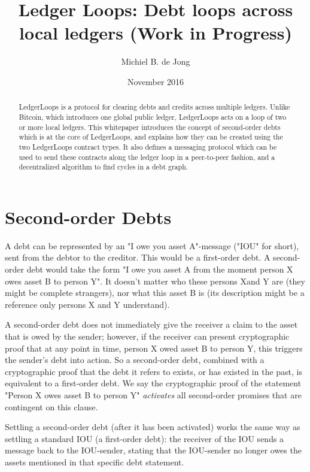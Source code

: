 \documentclass[11pt,twoside,a4paper]{article}
\begin{document}
\title{Ledger Loops: Debt loops across local ledgers (Work in Progress)}
\author{Michiel B. de Jong}
\date{November 2016}
\maketitle
\begin{abstract}
LedgerLoops is a protocol for clearing debts and credits across multiple ledgers. Unlike Bitcoin, which introduces one global public ledger, LedgerLoops acts on a loop of two or more local ledgers. This whitepaper introduces the concept of second-order debts which is at the core of LedgerLoops, and explains how they can be created using the two LedgerLoops contract types. It also defines a messaging protocol which can be used to send these contracts along the ledger loop in a peer-to-peer fashion, and a decentralized algorithm to find cycles in a debt graph.
\end{abstract}
\section{Second-order Debts}
A debt can be represented by an "I owe you asset A"-message ("IOU" for short), sent from the debtor to the creditor. This would be a first-order debt. A second-order debt would take the form "I owe you asset A from the moment person X owes asset B to person Y". It doesn't matter who these persons Xand Y are (they might be complete strangers), nor what this asset B is (its description might be a reference only persons X and Y understand).

A second-order debt does not immediately give the receiver a claim to the asset that is owed by the sender; however, if the receiver can present cryptographic proof that at any point in time, person X owed asset B to person Y, this triggers the sender's debt into action. So a second-order debt, combined with a cryptographic proof that the debt it refers to exists, or has existed in the past, is equivalent to a first-order debt. We say the cryptographic proof of the statement "Person X owes asset B to person Y" {\em activates} all second-order promises that are contingent on this clause.

Settling a second-order debt (after it has been activated) works the same way as settling a standard IOU (a first-order debt): the receiver of the IOU sends a message back to the IOU-sender, stating that the IOU-sender no longer owes the assets mentioned in that specific debt statement.
\end{document}
